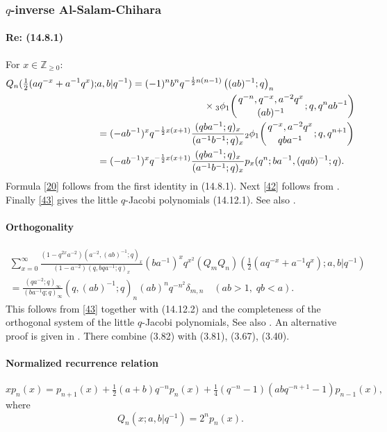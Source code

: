 \documentclass[twoside,11pt]{article}
\newcommand\ZZ{\mathbb{Z}}
\newcommand\de\delta
\newcommand\half{\frac12}
\newcommand\thalf{\tfrac12}
\newcommand\iy\infty
\newcommand\Znonneg{\ZZ_{\ge0}}
\newcommand{\qhypK}[5]{ \mbox{}_{#1}\phi_{#2}\!\left(
  \genfrac{}{}{0pt}{}{#3}{#4};#5\right)}
\begin{document}
\subsubsection*{$q$-inverse Al-Salam-Chihara}
%
\paragraph{Re: (14.8.1)}
For $x\in\Znonneg$:
%
\begin{align}
Q_n(\thalf(aq^{-x}+a^{-1}q^x);&a,b |  q^{-1})=
(-1)^n b^n q^{-\half n(n-1)}\left((ab)^{-1};q\right)_n
\nonumber\\
&\qquad\qquad\qquad\qquad\qquad\quad
\times\qhypK31{q^{-n},q^{-x},a^{-2}q^x}{(ab)^{-1}}{q,q^nab^{-1}}
\label{20}\\
&=(-ab^{-1})^x q^{-\half x(x+1)} \frac{(qba^{-1};q)_x}{(a^{-1}b^{-1};q)_x} 
\qhypK21{q^{-x},a^{-2}q^x}{qba^{-1}}{q,q^{n+1}}
\label{42}\\
&=(-ab^{-1})^x q^{-\half x(x+1)} \frac{(qba^{-1};q)_x}{(a^{-1}b^{-1};q)_x} 
p_x(q^n;ba^{-1},(qab)^{-1};q).
\label{43}
\end{align}
%
Formula \eqref{20} follows from the first identity in (14.8.1).
Next \eqref{42} follows from .
Finally \eqref{43} gives the little $q$-Jacobi polynomials (14.12.1).
See also .
%
\paragraph{Orthogonality}
%
\begin{multline}
\sum_{x=0}^\iy
\frac{(1-q^{2x}a^{-2}) (a^{-2},(ab)^{-1};q)_x}
{(1-a^{-2}) (q,bqa^{-1};q)_x} 
(ba^{-1})^xq^{x^2}
(Q_mQ_n)(\thalf(aq^{-x}+a^{-1}q^x);a,b |  q^{-1})\\
=\frac{(qa^{-2};q)_\iy}{(ba^{-1}q;q)_\iy} 
(q,(ab)^{-1};q)_n (ab)^nq^{-n^2} \de_{m,n}
\quad(ab>1,\;qb<a).
\label{21}
\end{multline}
%
This follows from \eqref{43} together with (14.12.2) and the completeness of
the orthogonal system of the little $q$-Jacobi polynomials,
See also . An alternative proof is given in
. There combine (3.82) with (3.81), (3.67), (3.40).
%
\paragraph{Normalized recurrence relation}
%
\begin{equation}
xp_n(x)=p_{n+1}(x)+\thalf(a+b)q^{-n} p_n(x)+
\tfrac14(q^{-n}-1)(abq^{-n+1}-1)p_{n-1}(x),
\label{22}
\end{equation}
%
where
\[
Q_n(x;a,b |  q^{-1})=2^n p_n(x).
\]
%
\end{document}
